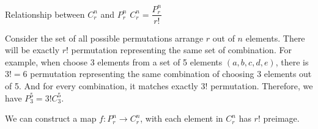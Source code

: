\begin{mysubsection}{Relationship between \texorpdfstring{$C^n_r$ and $P^n_r$}{ncr and npr}}
    $C^n_r = \dfrac{P^n_r}{r!}$

    Consider the set of all possible permutations arrange $r$ out of $n$ elements. There will be exactly $r!$ permutation representing the same set of combination.
    For example, when choose 3 elements from a set of 5 elements $(a,b,c,d,e)$, there is $3!=6$ permutation representing the same combination of choosing 3 elements out of 5.  
    And for every combination, it matches exactly $3!$ permutation.  
    Therefore, we have $P^5_3 = 3!C^5_3$.


    We can construct a map $f:P^n_r\rightarrow C^n_r$, with each element in $C^n_r$ has $r!$ preimage.
\end{mysubsection}
